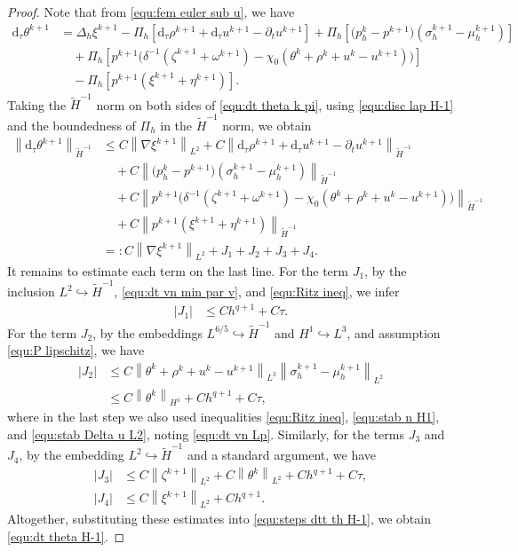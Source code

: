 \documentclass[11pt, reqno]{amsart}
\theoremstyle{definition}
\numberwithin{equation}{section}
\newcommand{\dtt}{\mathrm{d}_\tau}
\newcommand{\norm}[2]{\left\|{#1}\right\|_{#2}}
\newcommand{\abs}[1]{\left|{#1}\right|}
\begin{document}
\begin{proof}
Note that from \eqref{equ:fem euler sub u}, we have
\begin{align}\label{equ:dt theta k pi}
	\dtt \theta^{k+1}
	&=
	\Delta_h \xi^{k+1}
	-
	\Pi_h \left[ \dtt \rho^{k+1}+ \dtt u^{k+1}- \partial_t u^{k+1} \right] 
	+
	\Pi_h\left[ \big(p_h^k-p^{k+1}\big) (\sigma_h^{k+1}-\mu_h^{k+1}) \right]
	\nonumber\\
	&\quad
	+
	\Pi_h \left[ p^{k+1} \big(\delta^{-1}(\zeta^{k+1}+\omega^{k+1}) - \chi_0(\theta^k+\rho^k+u^k-u^{k+1})\big) \right]
	\nonumber\\
	&\quad
	- \Pi_h \left[ p^{k+1} (\xi^{k+1}+\eta^{k+1}) \right].
\end{align}
Taking the $\widetilde{H}^{-1}$ norm on both sides of \eqref{equ:dt theta k pi}, using \eqref{equ:disc lap H-1} and the boundedness of $\Pi_h$ in the $\widetilde{H}^{-1}$ norm, we obtain
\begin{align}\label{equ:steps dtt th H-1}
	\norm{\dtt \theta^{k+1}}{\widetilde{H}^{-1}}
	&\leq
	C \norm{\nabla \xi^{k+1}}{L^2}
	+
	C \norm{\dtt \rho^{k+1}+ \dtt u^{k+1}-\partial_t u^{k+1}}{\widetilde{H}^{-1}}
	\nonumber\\
	&\quad
	+
	C \norm{\big(p_h^k-p^{k+1}\big) (\sigma_h^{k+1}-\mu_h^{k+1})}{\widetilde{H}^{-1}}
	\nonumber\\
	&\quad
	+
	C \norm{ p^{k+1} \big(\delta^{-1}(\zeta^{k+1}+\omega^{k+1}) - \chi_0(\theta^k+\rho^k+u^k-u^{k+1})\big)}{\widetilde{H}^{-1}}
	\nonumber\\
	&\quad
	+
	C \norm{p^{k+1} (\xi^{k+1}+\eta^{k+1})}{\widetilde{H}^{-1}}
	\nonumber\\
	&=: C \norm{\nabla \xi^{k+1}}{L^2}
	+
	J_1+J_2+J_3+J_4.
\end{align}
It remains to estimate each term on the last line. For the term $J_1$, by the inclusion $L^2\hookrightarrow \widetilde{H}^{-1}$, \eqref{equ:dt vn min par v}, and \eqref{equ:Ritz ineq}, we infer
\begin{align*}
	\abs{J_1}
	&\leq
	Ch^{q+1} + C\tau.
\end{align*}
For the term $J_2$, by the embeddings $L^{6/5} \hookrightarrow \widetilde{H}^{-1}$ and $H^1\hookrightarrow L^3$, and assumption \eqref{equ:P lipschitz}, we have
\begin{align*}
	\abs{J_2}
	&\leq
	C\norm{\theta^k+ \rho^k+ u^k-u^{k+1}}{L^3} \norm{\sigma_h^{k+1}- \mu_h^{k+1}}{L^2}
	\\
	&\leq
	C \norm{\theta^k}{H^1} + Ch^{q+1} + C\tau,
\end{align*}
where in the last step we also used inequalities \eqref{equ:Ritz ineq}, \eqref{equ:stab n H1}, and \eqref{equ:stab Delta u L2}, noting \eqref{equ:dt vn Lp}. Similarly, for the terms $J_3$ and $J_4$, by the embedding $L^2 \hookrightarrow \widetilde{H}^{-1}$ and a standard argument, we have
\begin{align*}
	\abs{J_3}
	&\leq
	C \norm{\zeta^{k+1}}{L^2}
	+
	C\norm{\theta^k}{L^2}
	+
	Ch^{q+1} + C\tau,
	\\
	\abs{J_4}
	&\leq
	C\norm{\xi^{k+1}}{L^2}
	+
	Ch^{q+1}.
\end{align*}
Altogether, substituting these estimates into \eqref{equ:steps dtt th H-1}, we obtain \eqref{equ:dt theta H-1}.


\end{proof}
\end{document}
